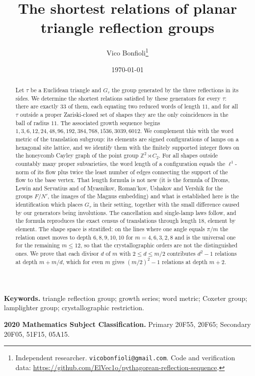 \documentclass[11pt]{article}
\title{The shortest relations of planar triangle reflection groups}
\author{Vico Bonfioli\thanks{Independent researcher. \texttt{vicobonfioli@gmail.com}.
Code and verification data:
\url{https://github.com/ElVec1o/pythagorean-reflection-sequence}.}}
\date{\today}
\theoremstyle{definition}
\theoremstyle{remark}
\newcommand{\Z}{\mathbb{Z}}
\begin{document}
\maketitle

\begin{abstract}
Let $\tau$ be a Euclidean triangle and $G_\tau$ the group generated by the three
reflections in its sides. We determine the shortest relations satisfied by these
generators for every $\tau$: there are exactly $33$ of them, each equating two
reduced words of length $11$, and for all $\tau$ outside a proper Zariski-closed
set of shapes they are the only coincidences in the ball of radius $11$. The
associated growth sequence begins
$1,3,6,12,24,48,96,192,384,768,1536,3039,6012$. We complement this with the
word metric of the translation subgroup: its elements are signed
configurations of lamps on a hexagonal site lattice, and we identify them with
the finitely supported integer flows on the honeycomb Cayley graph of the
point group $\Z^2\rtimes C_2$. For all shapes outside countably many proper
subvarieties, the word length of a configuration equals the $\ell^1$-norm of
its flow plus twice the least number of edges connecting the support of the
flow to the base vertex. That length formula is not new (it is the formula of
Droms, Lewin and Servatius and of Myasnikov, Roman'kov, Ushakov and Vershik for
the groups $F/N'$, the images of the Magnus embedding) and what is
established here is the identification which places $G_\tau$ in their setting,
together with the small difference caused by our generators being involutions.
The cancellation and single-lamp laws follow, and the
formula reproduces the exact census of translations through length $18$,
element by element. The shape space is stratified: on the lines where one
angle equals $\pi/m$ the relation onset moves to depth $6,8,9,10,10$ for
$m=4,6,3,2,8$ and is the universal one for the remaining $m\le12$, so that
the crystallographic orders are not the distinguished ones. We prove that
each divisor $d$ of $m$ with $2\le d\le m/2$ contributes $d^2-1$ relations at
depth $m+m/d$, which for even $m$ gives $(m/2)^2-1$ relations at depth $m+2$.
\end{abstract}

\medskip
\noindent\textbf{Keywords.} triangle reflection group; growth series; word
metric; Coxeter group; lamplighter group; crystallographic restriction.

\smallskip
\noindent\textbf{2020 Mathematics Subject Classification.}
Primary 20F55, 20F65; Secondary 20F05, 51F15, 05A15.
\end{document}
